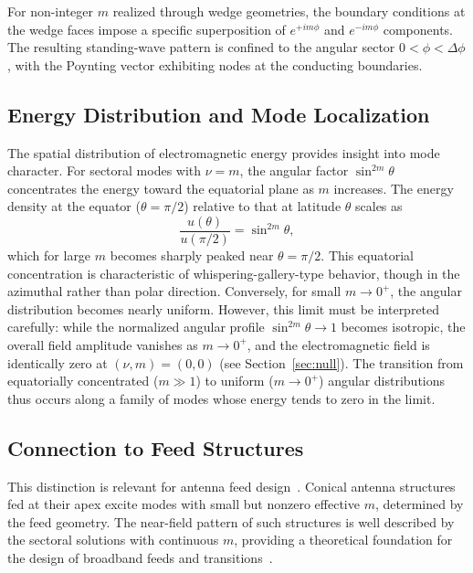 \documentclass[
  aip,
  amsmath,amssymb,
  preprint
]{revtex4-1}
\begin{document}
For non-integer $m$ realized through wedge geometries, the boundary conditions at the wedge faces impose a specific superposition of $e^{+im\phi}$ and $e^{-im\phi}$ components. The resulting standing-wave pattern is confined to the angular sector $0 < \phi < \Delta\phi$, with the Poynting vector exhibiting nodes at the conducting boundaries.


\subsection{Energy Distribution and Mode Localization}
The spatial distribution of electromagnetic energy provides insight into mode character. For sectoral modes with $\nu = m$, the angular factor $\sin^{2m}\theta$ concentrates the energy toward the equatorial plane as $m$ increases. The energy density at the equator ($\theta = \pi/2$) relative to that at latitude $\theta$ scales as
\begin{equation}
\frac{u(\theta)}{u(\pi/2)} = \sin^{2m}\theta,
\label{eq:energy_latitude}
\end{equation}
which for large $m$ becomes sharply peaked near $\theta = \pi/2$. This equatorial concentration is characteristic of whispering-gallery-type behavior, though in the azimuthal rather than polar direction. Conversely, for small $m \to 0^+$, the angular distribution becomes nearly 
uniform. However, this limit must be interpreted carefully: while the 
normalized angular profile $\sin^{2m}\theta \to 1$ becomes isotropic, the 
overall field amplitude vanishes as $m \to 0^+$, and the electromagnetic 
field is identically zero at $(\nu, m) = (0,0)$ (see Section~\ref{sec:null}). The transition from equatorially concentrated ($m \gg 1$) to uniform ($m \to 0^+$) angular distributions thus occurs along a family of modes whose energy tends to zero in the limit.

\subsection{Connection to Feed Structures}
This distinction is relevant for antenna feed design~\cite{Balanis2016, Chu1948}. Conical antenna structures fed at their apex excite modes with small but nonzero effective $m$, determined by the feed geometry. The near-field pattern of such structures is well described by the sectoral solutions with continuous $m$, providing a theoretical foundation for the design of broadband feeds and transitions~\cite{Schelkunoff1943, Papas1950}.
\end{document}
